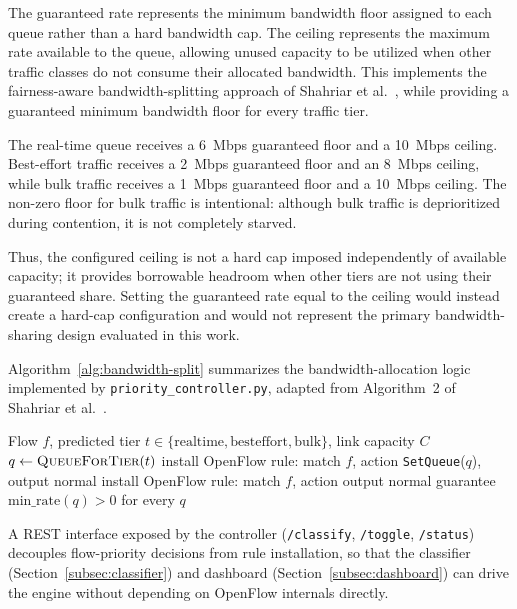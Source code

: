 The guaranteed rate represents the minimum bandwidth floor assigned to
each queue rather than a hard bandwidth cap. The ceiling represents the
maximum rate available to the queue, allowing unused capacity to be
utilized when other traffic classes do not consume their allocated
bandwidth. This implements the fairness-aware bandwidth-splitting
approach of Shahriar et al.~\cite{shahriar2024}, while providing a guaranteed
minimum bandwidth floor for every traffic tier.

The real-time queue receives a 6~Mbps guaranteed floor and a 10~Mbps
ceiling. Best-effort traffic receives a 2~Mbps guaranteed floor and an
8~Mbps ceiling, while bulk traffic receives a 1~Mbps guaranteed floor
and a 10~Mbps ceiling. The non-zero floor for bulk traffic is
intentional: although bulk traffic is deprioritized during contention,
it is not completely starved.

Thus, the configured ceiling is not a hard cap imposed independently of
available capacity; it provides borrowable headroom when other tiers
are not using their guaranteed share. Setting the guaranteed rate equal
to the ceiling would instead create a hard-cap configuration and would
not represent the primary bandwidth-sharing design evaluated in this
work.

Algorithm~\ref{alg:bandwidth-split} summarizes the bandwidth-allocation
logic implemented by \texttt{priority\_controller.py}, adapted from
Algorithm~2 of Shahriar et al.~\cite{shahriar2024}.

\begin{algorithm}[t]
\caption{Tiered Bandwidth Allocation (adapted from \cite{shahriar2024})}
\label{alg:bandwidth-split}
\begin{algorithmic}[1]
\REQUIRE Flow $f$, predicted tier $t \in \{\text{realtime}, \text{besteffort}, \text{bulk}\}$, link capacity $C$
\STATE $q \gets \textsc{QueueForTier}(t)$
    \STATE install OpenFlow rule: match $f$, action \texttt{SetQueue}($q$), output normal
\ELSE
    \STATE install OpenFlow rule: match $f$, action output normal 
\ENDIF
\STATE guarantee $\text{min\_rate}(q) > 0$ for every $q$ 
\end{algorithmic}
\end{algorithm}

A REST interface exposed by the controller (\texttt{/classify},
\texttt{/toggle}, \texttt{/status}) decouples flow-priority decisions from
rule installation, so that the classifier (Section~\ref{subsec:classifier})
and dashboard (Section~\ref{subsec:dashboard}) can drive the engine without
depending on OpenFlow internals directly.

